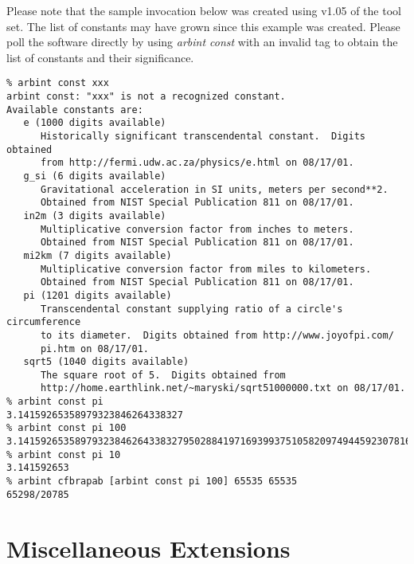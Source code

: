 \begin{tclcommandsampleinvocations}
Please note that the sample invocation below was created using
v1.05 of the tool set.  The list of constants may have grown
since this example was created.  Please poll the software directly
by using \emph{arbint const} with an invalid tag to obtain the 
list of constants and their significance.
\begin{scriptsize}
\begin{verbatim}
% arbint const xxx
arbint const: "xxx" is not a recognized constant.
Available constants are:
   e (1000 digits available)
      Historically significant transcendental constant.  Digits obtained
      from http://fermi.udw.ac.za/physics/e.html on 08/17/01.
   g_si (6 digits available)
      Gravitational acceleration in SI units, meters per second**2.
      Obtained from NIST Special Publication 811 on 08/17/01.
   in2m (3 digits available)
      Multiplicative conversion factor from inches to meters.
      Obtained from NIST Special Publication 811 on 08/17/01.
   mi2km (7 digits available)
      Multiplicative conversion factor from miles to kilometers.
      Obtained from NIST Special Publication 811 on 08/17/01.
   pi (1201 digits available)
      Transcendental constant supplying ratio of a circle's circumference
      to its diameter.  Digits obtained from http://www.joyofpi.com/
      pi.htm on 08/17/01.
   sqrt5 (1040 digits available)
      The square root of 5.  Digits obtained from
      http://home.earthlink.net/~maryski/sqrt51000000.txt on 08/17/01.
% arbint const pi
3.14159265358979323846264338327
% arbint const pi 100
3.141592653589793238462643383279502884197169399375105820974944592307816406286208998628034825342117067
% arbint const pi 10
3.141592653
% arbint cfbrapab [arbint const pi 100] 65535 65535
65298/20785
\end{verbatim}
\end{scriptsize}
\end{tclcommandsampleinvocations}


\section{Miscellaneous Extensions}

